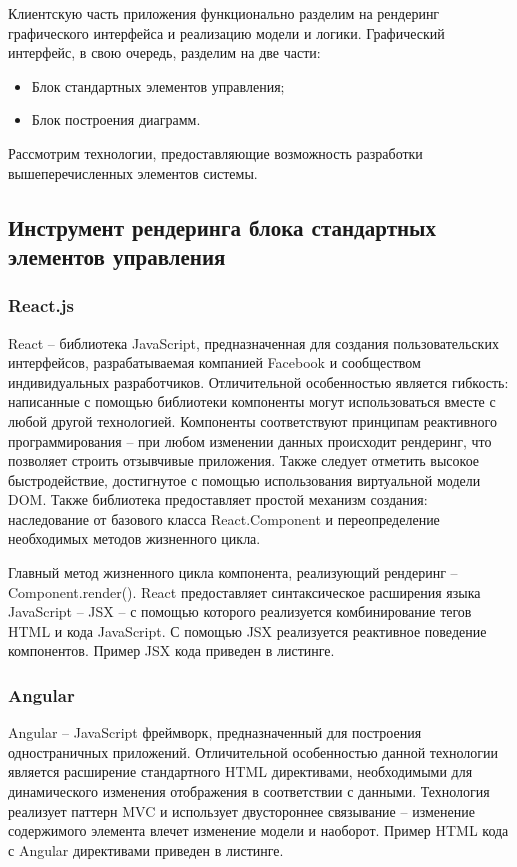 Клиентскую часть приложения функционально разделим на рендеринг графического интерфейса и реализацию модели и логики. Графический интерфейс, в свою очередь, разделим на две части:

\begin{itemize}
	\item Блок стандартных элементов управления;
	\item Блок построения диаграмм.
\end{itemize}

Рассмотрим технологии, предоставляющие возможность разработки вышеперечисленных элементов системы.

\subsection{Инструмент рендеринга блока стандартных элементов управления}

\subsubsection{React.js}

React – библиотека JavaScript, предназначенная для создания пользовательских интерфейсов, разрабатываемая компанией Facebook и сообществом индивидуальных разработчиков. Отличительной особенностью является гибкость: написанные с помощью библиотеки компоненты могут использоваться вместе с любой другой технологией. Компоненты соответствуют принципам реактивного программирования – при любом изменении данных происходит рендеринг, что позволяет строить отзывчивые приложения. Также следует отметить высокое быстродействие, достигнутое с помощью использования виртуальной модели DOM. Также библиотека предоставляет простой механизм создания: наследование от базового класса React.Component и переопределение необходимых методов жизненного цикла.
 
Главный метод жизненного цикла компонента, реализующий рендеринг – Component.render(). React предоставляет синтаксическое расширения языка JavaScript -- JSX -- с помощью которого реализуется комбинирование тегов HTML и кода JavaScript. С помощью JSX реализуется реактивное поведение компонентов. Пример JSX кода приведен в листинге.

\subsubsection{Angular}

Angular – JavaScript фреймворк, предназначенный для построения одностраничных приложений. Отличительной особенностью данной технологии является расширение стандартного HTML директивами, необходимыми для динамического изменения отображения в соответствии с данными. Технология реализует паттерн MVC и использует двустороннее связывание – изменение содержимого элемента влечет изменение модели и наоборот. Пример HTML кода с Angular директивами приведен в листинге. 

